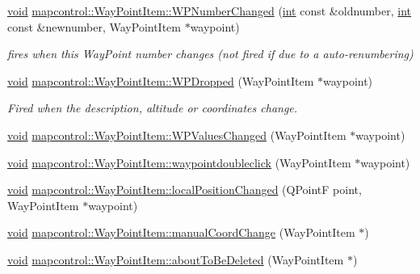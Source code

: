 \begin{DoxyCompactItemize}
\item 
\hyperlink{group___u_a_v_objects_plugin_ga444cf2ff3f0ecbe028adce838d373f5c}{void} \hyperlink{group___o_p_map_widget_ga259ccf14fc1866f99af110b4b0334d74}{mapcontrol\-::\-Way\-Point\-Item\-::\-W\-P\-Number\-Changed} (\hyperlink{ioapi_8h_a787fa3cf048117ba7123753c1e74fcd6}{int} const \&oldnumber, \hyperlink{ioapi_8h_a787fa3cf048117ba7123753c1e74fcd6}{int} const \&newnumber, Way\-Point\-Item $\ast$waypoint)
\begin{DoxyCompactList}\small\item\em fires when this Way\-Point number changes (not fired if due to a auto-\/renumbering) \end{DoxyCompactList}\item 
\hyperlink{group___u_a_v_objects_plugin_ga444cf2ff3f0ecbe028adce838d373f5c}{void} \hyperlink{group___o_p_map_widget_gae08b9a33683cbdb80ac273d6dcd75837}{mapcontrol\-::\-Way\-Point\-Item\-::\-W\-P\-Dropped} (Way\-Point\-Item $\ast$waypoint)
\begin{DoxyCompactList}\small\item\em Fired when the description, altitude or coordinates change. \end{DoxyCompactList}\item 
\hyperlink{group___u_a_v_objects_plugin_ga444cf2ff3f0ecbe028adce838d373f5c}{void} \hyperlink{group___o_p_map_widget_gac48456e8c6628a31dc82e235dbf94c2f}{mapcontrol\-::\-Way\-Point\-Item\-::\-W\-P\-Values\-Changed} (Way\-Point\-Item $\ast$waypoint)
\item 
\hyperlink{group___u_a_v_objects_plugin_ga444cf2ff3f0ecbe028adce838d373f5c}{void} \hyperlink{group___o_p_map_widget_ga94099ae67d892548f27f41b816f4735f}{mapcontrol\-::\-Way\-Point\-Item\-::waypointdoubleclick} (Way\-Point\-Item $\ast$waypoint)
\item 
\hyperlink{group___u_a_v_objects_plugin_ga444cf2ff3f0ecbe028adce838d373f5c}{void} \hyperlink{group___o_p_map_widget_gaa25d07c9de649428ed3dd38384048404}{mapcontrol\-::\-Way\-Point\-Item\-::local\-Position\-Changed} (Q\-Point\-F point, Way\-Point\-Item $\ast$waypoint)
\item 
\hyperlink{group___u_a_v_objects_plugin_ga444cf2ff3f0ecbe028adce838d373f5c}{void} \hyperlink{group___o_p_map_widget_ga976918f8397d48a08ae2af24e0ab219c}{mapcontrol\-::\-Way\-Point\-Item\-::manual\-Coord\-Change} (Way\-Point\-Item $\ast$)
\item 
\hyperlink{group___u_a_v_objects_plugin_ga444cf2ff3f0ecbe028adce838d373f5c}{void} \hyperlink{group___o_p_map_widget_ga7ab7e29d2f8728b8fb7e804f0f2a34ed}{mapcontrol\-::\-Way\-Point\-Item\-::about\-To\-Be\-Deleted} (Way\-Point\-Item $\ast$)
\end{DoxyCompactItemize}
